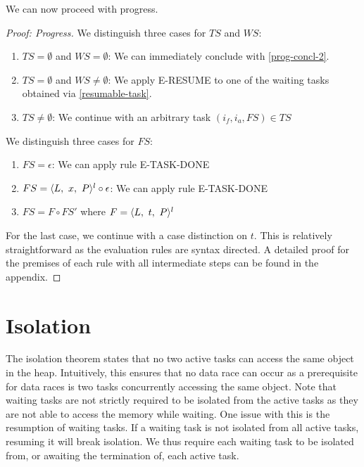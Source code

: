 We can now proceed with progress.
\begin{proof}[Proof: Progress]
We distinguish three cases for $TS$ and $WS$:
\begin{enumerate}
    \item $TS = \emptyset$ and $WS = \emptyset$: We can immediately conclude with \cref{prog-concl-2}.
    \item $TS = \emptyset$ and $WS \neq \emptyset$: We apply E-RESUME to one of the waiting tasks obtained via \cref{resumable-task}.
    \item $TS \neq \emptyset$: We continue with an arbitrary task $(i_f, i_a, FS) \in TS$
\end{enumerate}

We distinguish three cases for $FS$:
\begin{enumerate}
    \item $FS = \epsilon$: We can apply rule E-TASK-DONE
    \item $FS = \sframe{x} \circ \epsilon$: We can apply rule E-TASK-DONE
    \item $FS = F \circ FS'$ where $F = \sframe{t}$
\end{enumerate}

For the last case, we continue with a case distinction on $t$. This is relatively straightforward as the evaluation rules are syntax directed. A detailed proof for the premises of each rule with all intermediate steps can be found in the appendix.
\end{proof}

\section{Isolation}
The isolation theorem states that no two active tasks can access the same object in the heap. Intuitively, this ensures that no data race can occur as a prerequisite for data races is two tasks concurrently accessing the same object. Note that waiting tasks are not strictly required to be isolated from the active tasks as they are not able to access the memory while waiting. One issue with this is the resumption of waiting tasks. If a waiting task is not isolated from all active tasks, resuming it will break isolation. We thus require each waiting task to be isolated from, or awaiting the termination of, each active task.

